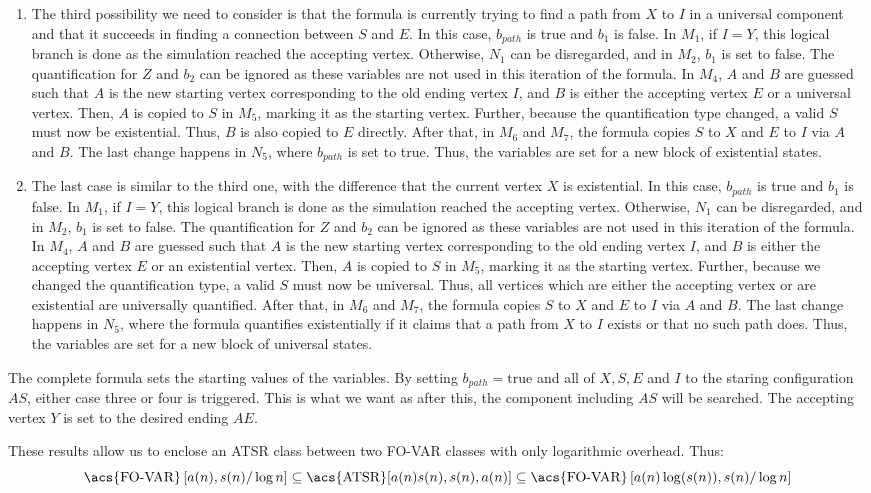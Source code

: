 \begin{enumerate}
    \item The third possibility we need to consider is that the formula is currently trying to find a path from $X$ to $I$ in a universal component and that it succeeds in finding a connection between $S$ and $E$.
    In this case, $b_{path}$ is true and $b_1$ is false.
    In $M_1$, if $I = Y$, this logical branch is done as the simulation reached the accepting vertex.
    Otherwise, $N_1$ can be disregarded, and in $M_2$, $b_1$ is set to false.
    The quantification for $Z$ and $b_2$ can be ignored as these variables are not used in this iteration of the formula.
    In $M_4$, $A$ and $B$ are guessed such that $A$ is the new starting vertex corresponding to the old ending vertex $I$, and $B$ is either the accepting vertex $E$ or a universal vertex.
    Then, $A$ is copied to $S$ in $M_5$, marking it as the starting vertex.
    Further, because the quantification type changed, a valid $S$ must now be existential.
    Thus, $B$ is also copied to $E$ directly.
    After that, in $M_6$ and $M_7$, the formula copies $S$ to $X$ and $E$ to $I$ via $A$ and $B$.
    The last change happens in $N_{5}$, where $b_{path}$ is set to true.
    Thus, the variables are set for a new block of existential states.

    \item The last case is similar to the third one, with the difference that the current vertex $X$ is existential.
    In this case, $b_{path}$ is true and $b_1$ is false.
    In $M_1$, if $I = Y$, this logical branch is done as the simulation reached the accepting vertex.
    Otherwise, $N_1$ can be disregarded, and in $M_2$, $b_1$ is set to false.
    The quantification for $Z$ and $b_2$ can be ignored as these variables are not used in this iteration of the formula.
    In $M_4$, $A$ and $B$ are guessed such that $A$ is the new starting vertex corresponding to the old ending vertex $I$, and $B$ is either the accepting vertex $E$ or an existential vertex.
    Then, $A$ is copied to $S$ in $M_5$, marking it as the starting vertex.
    Further, because we changed the quantification type, a valid $S$ must now be universal.
    Thus, all vertices which are either the accepting vertex or are existential are universally quantified.
    After that, in $M_6$ and $M_7$, the formula copies $S$ to $X$ and $E$ to $I$ via $A$ and $B$.
    The last change happens in $N_{5}$, where the formula quantifies existentially if it claims that a path from $X$ to $I$ exists or that no such path does.
    Thus, the variables are set for a new block of universal states.
\end{enumerate}
The complete formula sets the starting values of the variables.
By setting $b_{path} = \text{true}$ and all of $X, S, E$ and $I$ to the staring configuration $AS$, either case three or four is triggered.
This is what we want as after this, the component including $AS$ will be searched.
The accepting vertex $Y$ is set to the desired ending $AE$.

These results allow us to enclose an \acs{ATSR} class between two \acs{FO-VAR} classes with only logarithmic overhead.
Thus:
\[
    \text{\acs{FO-VAR}}\left[a(n), s(n)/\log n \right] \subseteq \text{\acs{ATSR}}[a(n)s(n), s(n), a(n)] \subseteq \text{\acs{FO-VAR}}\left[a(n)\log(s(n)), s(n)/\log n \right]
\]